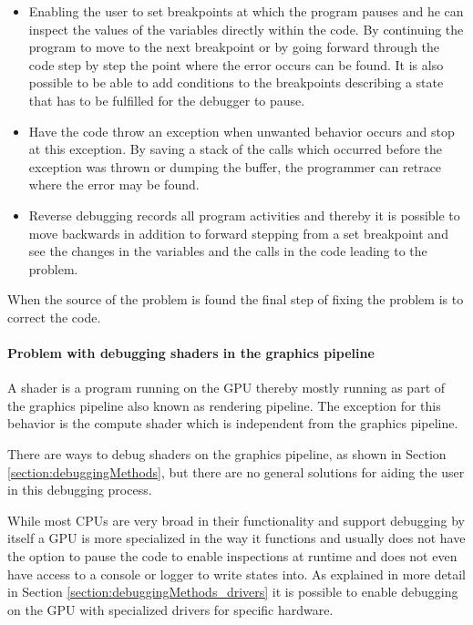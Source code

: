 \begin{itemize}

\item Enabling the user to set breakpoints at which the program pauses and he can inspect the values of the variables directly within the code. By continuing the program to move to the next breakpoint or by going forward through the code step by step the point where the error occurs can be found. It is also possible to be able to add conditions to the breakpoints describing a state that has to be fulfilled for the debugger to pause. 


\item Have the code throw an exception when unwanted behavior occurs and stop at this exception. By saving a stack of the calls which occurred before the exception was thrown or dumping the buffer, the programmer can retrace where the error may be found.


\item Reverse debugging records all program activities and thereby it is possible to move backwards in addition to forward stepping from a set breakpoint and see the changes in the variables and the calls in the code leading to the problem.

\end{itemize}

When the source of the problem is found the final step of fixing the problem is to correct the code.

\paragraph{Problem with debugging shaders in the graphics pipeline}
\label{section:problems}

A shader is a program running on the GPU thereby mostly running as part of the graphics pipeline also known as rendering pipeline. The exception for this behavior is the compute shader which is independent from the graphics pipeline.

There are ways to debug shaders on the graphics pipeline, as shown in Section \ref{section:debuggingMethods}, but there are no general solutions for aiding the user in this debugging process.

While most CPUs are very broad in their functionality and support debugging by itself a GPU is more specialized in the way it functions and usually does not have the option to pause the code to enable inspections at runtime and does not even have access to a console or logger to write states into. As explained in more detail in Section \ref{section:debuggingMethods_drivers} it is possible to enable debugging on the GPU with specialized drivers for specific hardware.

